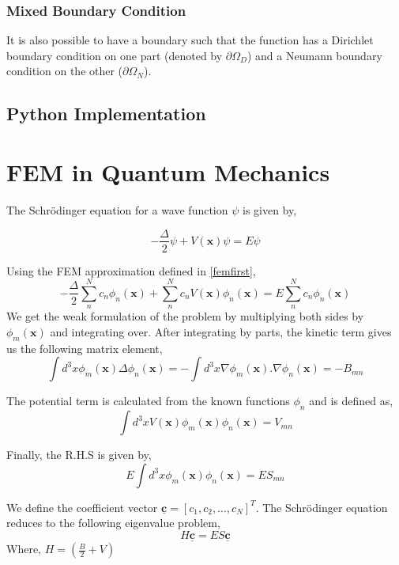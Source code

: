 \documentclass[a4paper,10pt]{report}
\begin{document}
\subsubsection{Mixed Boundary Condition}
It is also possible to have a boundary such that the function has a Dirichlet boundary
condition on one part (denoted by $\partial\Omega_D$) and a Neumann boundary condition
on the other ($\partial\Omega_N$).

\subsection{Python Implementation}
\section{FEM in Quantum Mechanics}
The Schrödinger equation for a wave function $\psi$ is given by,

\begin{equation}\label{schroedinger1}
 -\frac{\Delta}{2}\psi+V(\mathbf{x})\psi=E\psi
\end{equation}

 Using the FEM approximation defined in \eqref{femfirst},
\begin{equation}\label{schroedinger}
 -\frac{\Delta}{2}\displaystyle\sum_n^N c_n\phi_n(\mathbf{x})+\displaystyle\sum_n^N c_n V(\mathbf{x})\phi_n(\mathbf{x})=E\displaystyle\sum_n^N c_n\phi_n(\mathbf{x})
\end{equation}
 We get the weak formulation of the problem by multiplying both sides by $\phi_m(\mathbf{x})$ and integrating over. After integrating by parts, the kinetic term gives us
the following matrix element,
\begin{equation}\label{kineticterm}
 \int d^3x\phi_m(\mathbf{x})\Delta\phi_n(\mathbf{x}) = -\int d^3x\nabla\phi_m(\mathbf{x}).\nabla\phi_n(\mathbf{x}) = -B_{mn}
\end{equation}

 The potential term is calculated from the known functions $\phi_n$ and is defined as,
\begin{equation}\label{potentialterm}
 \int d^3xV(\mathbf{x})\phi_m(\mathbf{x})\phi_n(\mathbf{x}) = V_{mn}
\end{equation}

 Finally, the R.H.S is given by,
\begin{equation}
 E\int d^3x\phi_m(\mathbf{x})\phi_n(\mathbf{x})=ES_{mn}
\end{equation}

 We define the coefficient vector $\mathbf{\underline{c}}=[c_1,c_2,\ldots,c_N]^T$. The Schrödinger equation reduces to 
the following eigenvalue problem,
\begin{equation}\label{schroedingerfem}
  H\mathbf{\underline{c}}=ES\mathbf{\underline{c}}
\end{equation}
 Where, $H=\left(\frac{B}{2}+V\right)$
\end{document}
